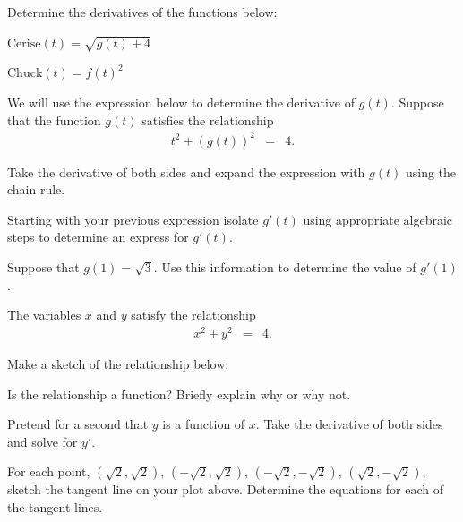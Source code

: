 \begin{problem}
\item Determine the derivatives of the functions below:

  \begin{subproblem}
    \item  ${\displaystyle \mathrm{Cerise}(t)=\sqrt{g(t)+4}}$
      \vfill

    \item  ${\displaystyle \mathrm{Chuck}(t)=f(t)^2}$
        \vfill

  \end{subproblem}

  \item We will use the expression below to determine the derivative of $g(t)$.
    Suppose that the function $g(t)$ satisfies the relationship
    \begin{eqnarray*}
      t^2 + \left(g(t)\right)^2 & = & 4.
    \end{eqnarray*}
    \begin{subproblem}
      \item  Take the derivative of both sides and expand the expression with $g(t)$ using the chain rule.
        \vfill
      \item Starting with your previous expression isolate $g'(t)$
        using appropriate algebraic steps to determine an express for $g'(t)$.
        \vfill
      \item Suppose that $g(1)=\sqrt{3}$. Use this information to
        determine the value of $g'(1)$.

        \vfill
    \end{subproblem}

  \clearpage

  \item The variables $x$ and $y$ satisfy the relationship
  \begin{eqnarray*}
    x^2 + y^2 & = & 4.
  \end{eqnarray*}
  \begin{subproblem}
    \item Make a sketch of the relationship below.
      \vfill
    \item Is the relationship a function? Briefly explain why or why not.
      \vspace{2em}
    \item Pretend for a second that $y$ is a function of $x$. Take the derivative
      of both sides and solve for $y'$.
      \vfill
    \item For each point, $(\sqrt{2},\sqrt{2})$, $(-\sqrt{2},\sqrt{2})$,
      $(-\sqrt{2},-\sqrt{2})$, $(\sqrt{2},-\sqrt{2})$, sketch the tangent line
      on your plot above. Determine the equations for each of the tangent lines.
      \vfill
      \vfill
  \end{subproblem}

\end{problem}

